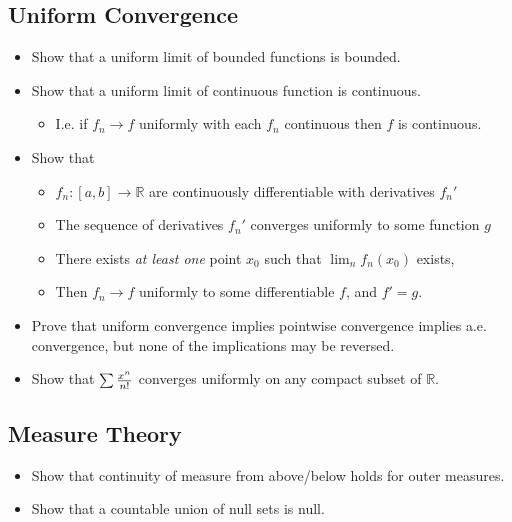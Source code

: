 \hypertarget{uniform-convergence}{%
\subsection{Uniform Convergence}\label{uniform-convergence}}

\begin{itemize}
\tightlist
\item
  Show that a uniform limit of bounded functions is bounded.
\item
  Show that a uniform limit of continuous function is continuous.

  \begin{itemize}
  \tightlist
  \item
    I.e. if \(f_n\to f\) uniformly with each \(f_n\) continuous then
    \(f\) is continuous.
  \end{itemize}
\item
  Show that

  \begin{itemize}
  \tightlist
  \item
    \(f_n: [a, b]\to {\mathbb{R}}\) are continuously differentiable with
    derivatives \(f_n'\)
  \item
    The sequence of derivatives \(f_n'\) converges uniformly to some
    function \(g\)
  \item
    There exists \emph{at least one} point \(x_0\) such that
    \(\lim_n f_n(x_0)\) exists,
  \item
    Then \(f_n \to f\) uniformly to some differentiable \(f\), and
    \(f' = g\).
  \end{itemize}
\item
  Prove that uniform convergence implies pointwise convergence implies
  a.e. convergence, but none of the implications may be reversed.
\item
  Show that \(\sum {x^n \over n!}\) converges uniformly on any compact
  subset of \({\mathbb{R}}\).
\end{itemize}

\hypertarget{measure-theory}{%
\subsection{Measure Theory}\label{measure-theory}}

\begin{itemize}
\item
  Show that continuity of measure from above/below holds for outer
  measures.
\item
  Show that a countable union of null sets is null.
\end{itemize}

